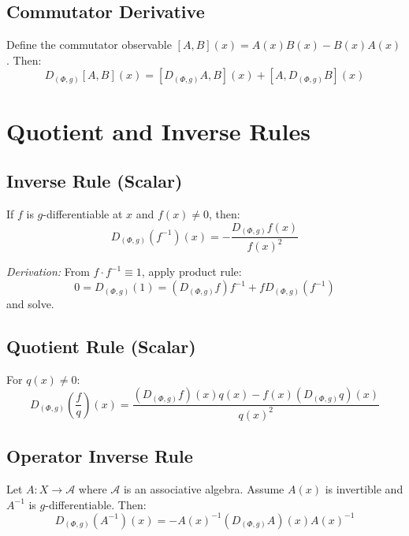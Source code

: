 \documentclass[12pt, oneside]{article}
\begin{document}
\subsection{Commutator Derivative}

Define the commutator observable $[A, B](x) = A(x)B(x) - B(x)A(x)$. Then:
\begin{equation}
D_{(\Phi,g)} [A, B](x) = [D_{(\Phi,g)} A, B](x) + [A, D_{(\Phi,g)} B](x)
\end{equation}

\section{Quotient and Inverse Rules}

\subsection{Inverse Rule (Scalar)}

If $f$ is $g$-differentiable at $x$ and $f(x) \neq 0$, then:
\begin{equation}
D_{(\Phi,g)} (f^{-1})(x) = -\frac{D_{(\Phi,g)} f(x)}{f(x)^2}
\end{equation}

\textit{Derivation:} From $f \cdot f^{-1} \equiv 1$, apply product rule:
\begin{equation}
0 = D_{(\Phi,g)}(1) = (D_{(\Phi,g)} f) f^{-1} + f D_{(\Phi,g)}(f^{-1})
\end{equation}
and solve.

\subsection{Quotient Rule (Scalar)}

For $q(x) \neq 0$:
\begin{equation}
D_{(\Phi,g)} \left( \frac{f}{q} \right)(x) = \frac{(D_{(\Phi,g)} f)(x) q(x) - f(x) (D_{(\Phi,g)} q)(x)}{q(x)^2}
\end{equation}

\subsection{Operator Inverse Rule}

Let $A: X \rightarrow \mathcal{A}$ where $\mathcal{A}$ is an associative algebra. Assume $A(x)$ is invertible and $A^{-1}$ is $g$-differentiable. Then:
\begin{equation}
D_{(\Phi,g)} (A^{-1})(x) = -A(x)^{-1} (D_{(\Phi,g)} A)(x) A(x)^{-1}
\end{equation}
\end{document}
